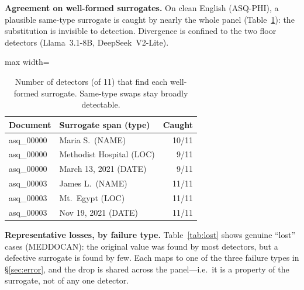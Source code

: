 \documentclass[11pt]{article}
\begin{document}
{\footnotesize
\setlength{\fboxsep}{1pt}%
\newcommand{\panel}[3]{\par\vspace{2.5pt}\noindent\fcolorbox{cline}{white}{\parbox{0.965\linewidth}{%
\textbf{#1}\hfill{\scriptsize\color{cmuted}#2}\\[2pt]\ttfamily\scriptsize #3}}}

\par}
\vspace{4pt}

\textbf{Agreement on well-formed surrogates.} On clean English (ASQ-PHI), a plausible same-type surrogate is caught by nearly the whole panel (Table~\ref{tab:agree}): the substitution is invisible to detection. Divergence is confined to the two floor detectors (Llama~3.1-8B, DeepSeek~V2-Lite).

\begin{table}[h]\centering\small
\begin{adjustbox}{max width=\columnwidth}%
\begin{tabular}{llr}
\toprule
Document & Surrogate span (type) & Caught\\
\midrule
asq\_00000 & Maria S.\ (NAME) & 10/11\\
asq\_00000 & Methodist Hospital (LOC) & 9/11\\
asq\_00000 & March 13, 2021 (DATE) & 9/11\\
asq\_00003 & James L.\ (NAME) & 11/11\\
asq\_00003 & Mt.\ Egypt (LOC) & 11/11\\
asq\_00003 & Nov 19, 2021 (DATE) & 11/11\\
\bottomrule
\end{tabular}
\end{adjustbox}
\caption{Number of detectors (of 11) that find each well-formed surrogate. Same-type swaps stay broadly detectable.}\label{tab:agree}
\end{table}

\textbf{Representative losses, by failure type.} Table~\ref{tab:lost} shows genuine ``lost'' cases (MEDDOCAN): the original value was found by most detectors, but a defective surrogate is found by few. Each maps to one of the three failure types in \S\ref{sec:error}, and the drop is shared across the panel---i.e.\ it is a property of the surrogate, not of any one detector.
\end{document}
